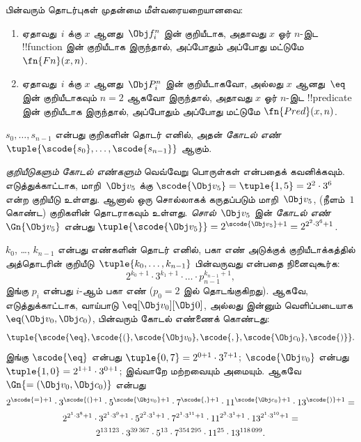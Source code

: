 \documentclass[../../../include/open-logic-section]{subfiles}
\begin{document}
\begin{prop}
பின்வரும் தொடர்புகள் முதன்மை மீள்வரையறையானவை:
\begin{enumerate}
\item ஏதாவது~$i$ க்கு $x$ ஆனது~$\Obj f^n_i$ இன் குறியீடாக, அதாவது $x$
  ஓர் $n$-இட !!{function} இன் குறியீடாக இருந்தால், அப்போதும் அப்போது மட்டுமே
  $\fn{Fn}(x, n)$.
\item ஏதாவது~$i$ க்கு $x$ ஆனது~$\Obj P^n_i$ இன் குறியீடாகவோ, அல்லது
  $x$ ஆனது~$\eq$ இன் குறியீடாகவும் $n = 2$ ஆகவோ இருந்தால், அதாவது $x$
  ஓர் $n$-இட !!{predicate} இன் குறியீடாக இருந்தால், அப்போதும் அப்போது
  மட்டுமே $\fn{Pred}(x, n)$.
\end{enumerate}
\end{prop}

\begin{defn}
$s_0, \dots, s_{n-1}$ என்பது குறிகளின் தொடர் எனில், அதன் \emph{கோடல்
  எண்} $\tuple{\scode{s_0}, \dots, \scode{s_{n-1}}}$ ஆகும்.
\end{defn}

\begin{explain}
\emph{குறியீடுகளும்} \emph{கோடல் எண்களும்} வெவ்வேறு பொருள்கள் என்பதைக்
கவனிக்கவும். எடுத்துக்காட்டாக, மாறி~$\Obj v_5$ க்கு
$\scode{\Obj v_5} = \tuple{1, 5} = 2^2\cdot 3^6$ என்ற குறியீடு உள்ளது.
ஆனால் ஒரு சொல்லாகக் கருதப்படும் மாறி~$\Obj v_5$, (நீளம்~$1$ கொண்ட)
குறிகளின் தொடராகவும் உள்ளது. \emph{சொல்}~$\Obj v_5$ இன் \emph{கோடல்
எண்}~$\Gn{\Obj v_5}$ என்பது $\tuple{\scode{\Obj v_5}} = 2^{\scode{\Obj
    v_5} + 1} = 2^{2^2\cdot 3^6 + 1}$.
\end{explain}

\begin{ex}
$k_0$, \dots, $k_{n-1}$ என்பது எண்களின் தொடர் எனில், பகா எண் அடுக்குக்
குறியீடாக்கத்தில் அத்தொடரின் குறியீடு~$\tuple{k_0, \dots, k_{n-1}}$
பின்வருவது என்பதை நினைவுகூர்க:
\[
2^{k_0+1}\cdot3^{k_1+1}\cdot \dots \cdot p_{n-1}^{k_{n-1}+1},
\]
இங்கு $p_i$ என்பது $i$-ஆம் பகா எண் ($p_0 = 2$ இல் தொடங்குகிறது).
ஆகவே, எடுத்துக்காட்டாக, வாய்பாடு $\eq[\Obj v_0][\Obj 0]$, அல்லது இன்னும்
வெளிப்படையாக ${\eq}(\Obj v_0,\Obj c_0)$, பின்வரும் கோடல் எண்ணைக் கொண்டது:
\[
\tuple{\scode{\eq},\scode{(},\scode{\Obj v_0},\scode{,}, \scode{\Obj
    c_0},\scode{)}}.
\]
இங்கு $\scode{\eq}$ என்பது $\tuple{0,7} = 2^{0+1}\cdot
3^{7+1}$; $\scode{\Obj v_0}$ என்பது $\tuple{1,0} = 2^{1+1}\cdot3^{0+1}$;
இவ்வாறே மற்றவையும் அமையும். ஆகவே $\Gn{=(\Obj v_0,\Obj c_0)}$ என்பது
\begin{multline*}
2^{\scode{=} + 1}\cdot 3^{\scode{(}+1}\cdot 5^{\scode{\Obj v_0}+1}
\cdot 7^{\scode{,} + 1} \cdot 11^{\scode{\Obj c_0}+1} \cdot
13^{\scode{)}+1} = \\
2^{2^1\cdot 3^8 + 1}\cdot 3^{2^1\cdot 3^9+1}\cdot 5^{2^2\cdot 3^1+1}
\cdot 7^{2^1\cdot 3^{11} + 1} \cdot 11^{2^3\cdot3^1+1} \cdot
13^{2^1\cdot3^{10}+1} = \\
2^{13\,123}\cdot 3^{39\,367}\cdot 5^{13}\cdot 7^{354\,295}\cdot11^{25}\cdot13^{118\,099}.
\end{multline*}
\end{ex}
\end{document}
